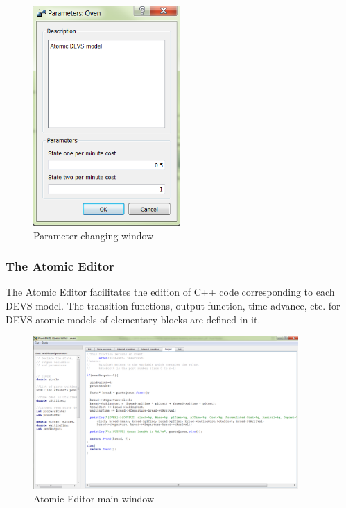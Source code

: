 \documentclass[titlepage]{article}%
\begin{document}
{\begin{figure}[ht!]
  \centering
    \includegraphics[width=0.5\textwidth]{Fig5.png}
    \caption{Parameter changing window}
    \label{para_win}
\end{figure}


\subsubsection{The Atomic Editor}
The Atomic Editor facilitates the edition of C++ code corresponding to each DEVS model. The transition functions, output function, time advance, etc. for DEVS atomic models of elementary blocks are defined in it.


\begin{figure}[ht!]
  \centering
    \includegraphics[width=0.9\textwidth]{Fig6.png}
    \caption{Atomic Editor main window}
    \label{atomic_win}
\end{figure}

}
\end{document}
